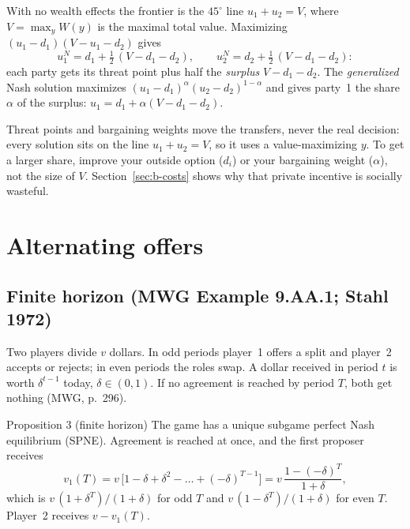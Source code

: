 With no wealth effects the frontier is the $45^\circ$ line $u_1 + u_2 = V$, where
$V = \max_y W(y)$ is the maximal total value. Maximizing $(u_1 - d_1)(V - u_1 - d_2)$ gives
\[
  u_1^N = d_1 + \tfrac{1}{2}\,(V - d_1 - d_2), \qquad u_2^N = d_2 + \tfrac{1}{2}\,(V - d_1 - d_2):
\]
each party gets its threat point plus half the \emph{surplus} $V - d_1 - d_2$. The
\emph{generalized} Nash solution maximizes $(u_1 - d_1)^{\alpha}(u_2 - d_2)^{1-\alpha}$ and gives
party~1 the share $\alpha$ of the surplus: $u_1 = d_1 + \alpha(V - d_1 - d_2)$.

\begin{keyidea}
Threat points and bargaining weights move the transfers, never the real decision: every
solution sits on the line $u_1 + u_2 = V$, so it uses a value-maximizing $y$. To get a larger
share, improve your outside option ($d_i$) or your bargaining weight ($\alpha$), not the size
of $V$. Section~\ref{sec:b-costs} shows why that private incentive is socially wasteful.
\end{keyidea}

\section{Alternating offers}\label{sec:b-rub}

\subsection{Finite horizon (MWG Example 9.AA.1; Stahl 1972)}

Two players divide $v$ dollars. In odd periods player~1 offers a split and player~2 accepts or
rejects; in even periods the roles swap. A dollar received in period $t$ is worth $\delta^{t-1}$
today, $\delta \in (0,1)$. If no agreement is reached by period $T$, both get nothing
(MWG, p.~296).

\begin{prop}{Proposition 3 (finite horizon)}
The game has a unique subgame perfect Nash equilibrium (SPNE). Agreement is reached at once, and
the first proposer receives
\[
  v_1(T) = v\,\big[1 - \delta + \delta^2 - \dots + (-\delta)^{T-1}\big]
         = v\,\frac{1 - (-\delta)^{T}}{1 + \delta},
\]
which is $v\,(1 + \delta^T)/(1+\delta)$ for odd $T$ and $v\,(1 - \delta^T)/(1+\delta)$ for even $T$.
Player~2 receives $v - v_1(T)$.
\end{prop}

